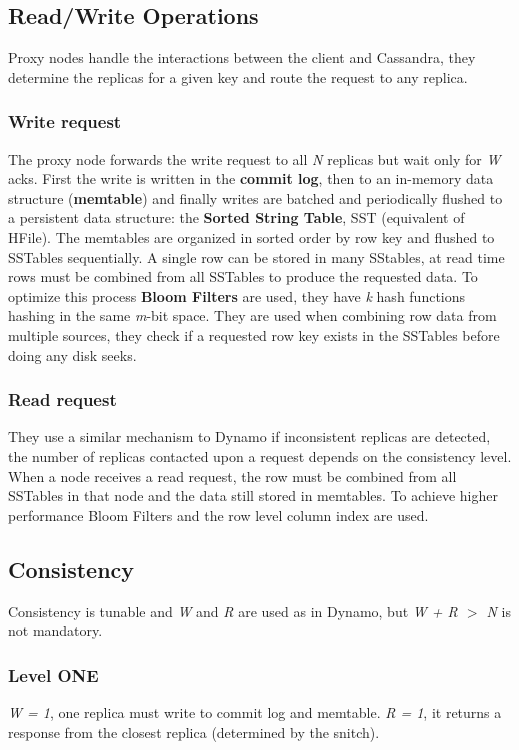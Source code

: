 	\subsection{Read/Write Operations}
	Proxy nodes handle the interactions between the client and Cassandra, they determine the replicas for a given key and route the request to any replica.
		\subsubsection{Write request}
		The proxy node forwards the write request to all \textit{N} replicas but wait only for \textit{W} acks.\newline
		First the write is written in the \textbf{commit log}, then to an in-memory data structure (\textbf{memtable}) and finally writes are batched and periodically flushed to a persistent data structure: the \textbf{Sorted String Table}, SST (equivalent of HFile).\newline
		The memtables are organized in sorted order by row key and flushed to SSTables sequentially.\newline
		A single row can be stored in many SStables, at read time rows must be combined from all SSTables to produce the requested data.\newline
		To optimize this process \textbf{Bloom Filters} are used, they have \textit{k} hash functions hashing in the same \textit{m}-bit space. They are used when combining row data from multiple sources, they check if a requested row key exists in the SSTables before doing any disk seeks.
		\subsubsection{Read request}
		They use a similar mechanism to Dynamo if inconsistent replicas are detected, the number of replicas contacted upon a request depends on the consistency level.\newline
		When a node receives a read request, the row must be combined from all SSTables in that node and the data still stored in memtables.\newline
		To achieve higher performance Bloom Filters and the row level column index are used.
	\subsection{Consistency}
	Consistency is tunable and \textit{W} and \textit{R} are used as in Dynamo, but \textit{W + R $>$ N} is not mandatory.
		\subsubsection{Level ONE}
		\textit{W = 1}, one replica must write to commit log and memtable.\newline
		\textit{R = 1}, it returns a response from the closest replica (determined by the snitch).
